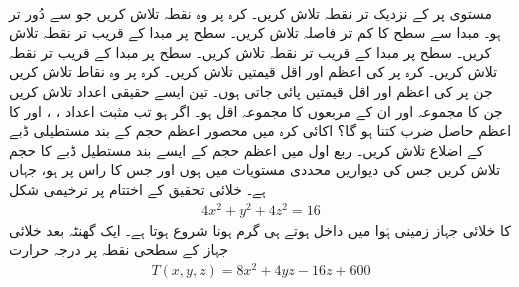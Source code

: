 \\
مستوی  پر  کے   نزدیک تر نقطہ تلاش کریں۔
کرہ   پر وہ نقطہ تلاش کریں جو  سے  دُور تر ہو۔
مبدا سے سطح  کا کم تر فاصلہ تلاش کریں۔
سطح  پر مبدا کے قریب تر نقطہ تلاش کریں۔
سطح  پر مبدا کے  قریب تر نقطہ تلاش کریں۔
سطح  پر مبدا کے  قریب تر نقطہ تلاش کریں۔
کرہ  پر کی اعظم اور اقل قیمتیں تلاش کریں۔
کرہ  پر وہ نقاط تلاش کریں جن پر  کی اعظم اور اقل قیمتیں پائی جاتی ہوں۔
تین ایسے حقیقی اعداد تلاش کریں جن کا مجموعہ   اور ان کے مربعوں کا مجموعہ اقل ہو۔ 
اگر  ہو تب مثبت اعداد  ، ،  اور  کا اعظم حاصل ضرب کتنا ہو گا؟
اکائی کرہ میں محصور   اعظم حجم کے  بند مستطیلی ڈبے  کے اضلاع تلاش کریں۔
ربع اول میں  اعظم حجم کے ایسے بند  مستطیل ڈبے  کا حجم تلاش کریں جس کی دیواریں محددی  مستویات میں ہوں اور جس کا راس  پر ہو، جہاں  ہے۔
خلائی تحقیق کے اختتام  پر ترخیمی  شکل
\begin{align*}
4x^2+y^2+4z^2=16
\end{align*}
کا خلائی جہاز  زمینی ہَوا میں داخل ہوتے ہی گرم ہونا شروع ہوتا ہے۔ ایک گھنٹہ بعد  خلائی جہاز کے سطحی  نقطہ  پر درجہ حرارت
\begin{align*}
T(x,y,z)=8x^2+4yz-16z+600
\end{align*}
